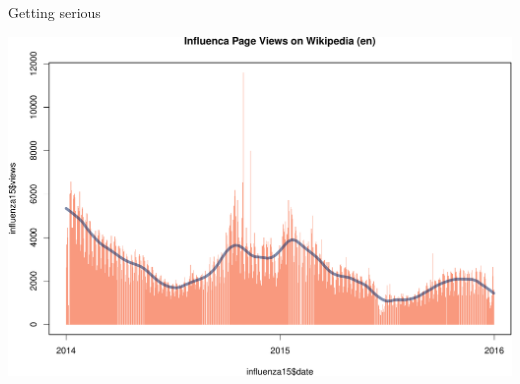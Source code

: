 \documentclass[ignorenonframetext,]{beamer}
\begin{document}
\begin{frame}{Getting serious}

\includegraphics{json_case_files/figure-beamer/unnamed-chunk-12-1.pdf}

\end{frame}
\end{document}
